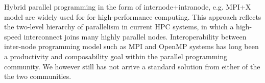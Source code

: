 Hybrid parallel programming in the form of internode+intranode, e.g. MPI+X model are widely used for 
for high-performance computing. This approach reflects the two-level hierarchy of parallelism in current HPC systems, 
in which a high-speed interconnect
joins many highly parallel nodes.
Interoperability between inter-node programming model such as MPI and OpenMP 
systems has long been a productivity and composability goal within
the parallel programming community. We however still has not arrive a standard solution from either of the the two communities. 


